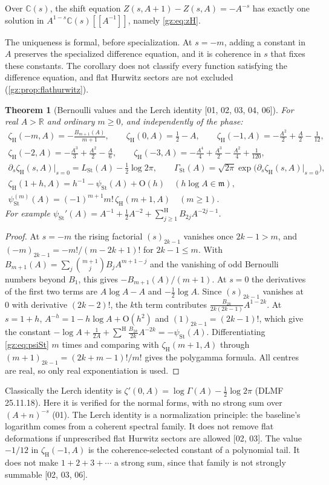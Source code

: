 \documentclass[11pt,a4paper]{article}
\numberwithin{equation}{section}
\newtheorem{theorem}{Theorem}[section]
\theoremstyle{definition}
\theoremstyle{remark}
\newcommand{\R}{\mathbb R}
\newcommand{\C}{\mathbb C}
\newcommand{\mm}{\mathfrak m}
\newcommand{\Sh}{\mathop{\textstyle\sum}\nolimits^{\mathrm H}}
\newcommand{\LSt}{L_{\mathrm{St}}}
\newcommand{\GSt}{\Gamma_{\mathrm{St}}}
\newcommand{\psiSt}{\psi_{\mathrm{St}}}
\newcommand{\zH}{\zeta_{\mathrm H}}
\newcommand{\src}[1]{\textup{[#1]}}
\newcommand{\bigO}{\mathrm{O}}
\begin{document}
\begin{corollary}[Formal uniqueness \src{03}]\label{gz:cor:hurwitz-unique}
Over $\C(s)$, the shift equation $Z(s,A+1)-Z(s,A)=-A^{-s}$ has exactly one
solution in $A^{1-s}\C(s)[[A^{-1}]]$, namely \eqref{gz:eq:zH}.
\end{corollary}
The uniqueness is formal, before specialization. At $s=-m$, adding a
constant in $A$ preserves the specialized difference equation, and it is
coherence in $s$ that fixes these constants. The corollary does not
classify every function satisfying the difference equation, and flat
Hurwitz sectors are not excluded (\cref{gz:prop:flathurwitz}).

\begin{theorem}[Bernoulli values and the Lerch identity \src{01, 02, 03, 04, 06}]\label{gz:thm:lerch}
For real $A>\R$ and ordinary $m\ge0$, and independently of the phase:
\begin{gather*}
\zH(-m,A)=-\frac{B_{m+1}(A)}{m+1},\qquad
\zH(0,A)=\tfrac12-A,\qquad
\zH(-1,A)=-\tfrac{A^2}2+\tfrac A2-\tfrac1{12},\\
\zH(-2,A)=-\tfrac{A^3}3+\tfrac{A^2}2-\tfrac A6,\qquad
\zH(-3,A)=-\tfrac{A^4}4+\tfrac{A^3}2-\tfrac{A^2}4+\tfrac1{120},\\
\partial_s\zH(s,A)\big|_{s=0}=\LSt(A)-\tfrac12\log2\pi,\qquad
\GSt(A)=\sqrt{2\pi}\exp\bigl(\partial_s\zH(s,A)|_{s=0}\bigr),\\
\zH(1+h,A)=h^{-1}-\psiSt(A)+\bigO(h)\quad(h\log A\in\mm),\\
\psiSt^{(m)}(A)=(-1)^{m+1}m!\,\zH(m+1,A)\quad(m\ge1).
\end{gather*}
For example $\psiSt'(A)=A^{-1}+\tfrac12A^{-2}+\Sh_{j\ge1}B_{2j}A^{-2j-1}$.
\end{theorem}
\begin{proof}
At $s=-m$ the rising factorial $(s)_{2k-1}$ vanishes once $2k-1>m$, and
$(-m)_{2k-1}=-m!/(m-2k+1)!$ for $2k-1\le m$. With
$B_{m+1}(A)=\sum_j\binom{m+1}jB_jA^{m+1-j}$ and the vanishing of odd
Bernoulli numbers beyond $B_1$, this gives $-B_{m+1}(A)/(m+1)$. At $s=0$
the derivatives of the first two terms are $A\log A-A$ and $-\tfrac12\log A$.
Since $(s)_{2k-1}$ vanishes at $0$ with derivative $(2k-2)!$, the $k$th term
contributes $\frac{B_{2k}}{2k(2k-1)}A^{1-2k}$. At $s=1+h$,
$A^{-h}=1-h\log A+\bigO(h^2)$ and $(1)_{2k-1}=(2k-1)!$, which give the
constant $-\log A+\frac1{2A}+\Sh\frac{B_{2k}}{2k}A^{-2k}=-\psiSt(A)$.
Differentiating \eqref{gz:eq:psiSt} $m$ times and comparing with
$\zH(m+1,A)$ through $(m+1)_{2k-1}=(2k+m-1)!/m!$ gives the polygamma formula.
All centres are real, so only real exponentiation is used.
\end{proof}
Classically the Lerch identity is $\zeta'(0,A)=\log\Gamma(A)-\tfrac12\log2\pi$
(DLMF 25.11.18). Here it is verified for the normal forms, with no strong sum
over $(A+n)^{-s}$ (01). The Lerch identity is a normalization principle: the
baseline's logarithm comes from a coherent spectral family. It does not
remove flat deformations if unprescribed flat Hurwitz sectors are allowed
\src{02, 03}. The value $-1/12$ in $\zH(-1,A)$ is the coherence-selected
constant of a polynomial tail. It does not make $1+2+3+\cdots$ a strong sum,
since that family is not strongly summable \src{02, 03, 06}.
\end{document}
